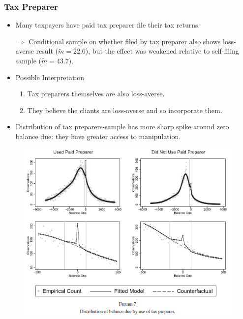 \documentclass[dvipdfmx,12pt]{beamer}
\begin{document}
\begin{frame}\frametitle{Tax Preparer}
  \begin{itemize}
    \item Many taxpayers have paid tax preparer file their tax returns.

    $\Rightarrow$ Conditional sample on whether filed by tax preparer also shows loss-averse result ($\tilde{m} = 22.6$), but the effect was weakened relative to self-filing sample ($\tilde{m} = 43.7$).

    \item Possible Interpretation

    \begin{enumerate}
      \item Tax preparers themselves are also loss-averse.

      \item They believe the cliants are loss-averse and so incorporate them.
    \end{enumerate}

    \item Distribution of tax preparers-sample has more sharp spike around zero balance due: they have greater access to manipulation.
  \end{itemize}
\end{frame}

\begin{frame}
  \begin{figure}
    \includegraphics[keepaspectratio, scale = 0.7]{fig_tab/ARJ_F7.png}
  \end{figure}
\end{frame}
\end{document}
